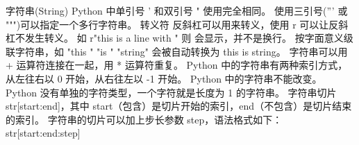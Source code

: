  





字符串(String)
Python 中单引号 ' 和双引号 " 使用完全相同。
使用三引号(''' 或 """)可以指定一个多行字符串。
转义符 \。
反斜杠可以用来转义，使用 r 可以让反斜杠不发生转义。 如 r"this is a line with \n" 则 \n 会显示，并不是换行。
按字面意义级联字符串，如 "this " "is " "string" 会被自动转换为 this is string。
字符串可以用 + 运算符连接在一起，用 * 运算符重复。
Python 中的字符串有两种索引方式，从左往右以 0 开始，从右往左以 -1 开始。
Python 中的字符串不能改变。
Python 没有单独的字符类型，一个字符就是长度为 1 的字符串。
字符串切片 str[start:end]，其中 start（包含）是切片开始的索引，end（不包含）是切片结束的索引。
字符串的切片可以加上步长参数 step，语法格式如下：str[start:end:step]

